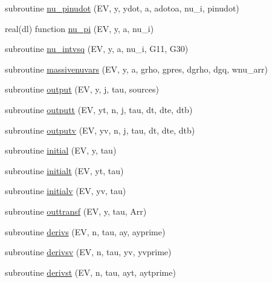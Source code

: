 \begin{DoxyCompactItemize}
\item 
subroutine \mbox{\hyperlink{namespacegaugeinterface_acba44d8f8f824999640418908be29b9b}{nu\+\_\+pinudot}} (EV, y, ydot, a, adotoa, nu\+\_\+i, pinudot)
\item 
real(dl) function \mbox{\hyperlink{namespacegaugeinterface_a33373e2888fd46e2c443d7e8c2785639}{nu\+\_\+pi}} (EV, y, a, nu\+\_\+i)
\item 
subroutine \mbox{\hyperlink{namespacegaugeinterface_a2e8822823d298cb0912b5ec22ea4a6ff}{nu\+\_\+intvsq}} (EV, y, a, nu\+\_\+i, G11, G30)
\item 
subroutine \mbox{\hyperlink{namespacegaugeinterface_ae4228ed9cfb9382025eb84617b0ed091}{massivenuvars}} (EV, y, a, grho, gpres, dgrho, dgq, wnu\+\_\+arr)
\item 
subroutine \mbox{\hyperlink{namespacegaugeinterface_ac370c67bc9750bf5749a69531fe3ffc1}{output}} (EV, y, j, tau, sources)
\item 
subroutine \mbox{\hyperlink{namespacegaugeinterface_a5235d59ec77fa4b3a41d9754c8e447ca}{outputt}} (EV, yt, n, j, tau, dt, dte, dtb)
\item 
subroutine \mbox{\hyperlink{namespacegaugeinterface_ad9126befa5df67da981345f6230fede4}{outputv}} (EV, yv, n, j, tau, dt, dte, dtb)
\item 
subroutine \mbox{\hyperlink{namespacegaugeinterface_aa05aaad2bec1907778ea8eae3a7ba521}{initial}} (EV, y, tau)
\item 
subroutine \mbox{\hyperlink{namespacegaugeinterface_afbc0a211756e4b923725483b6c961e75}{initialt}} (EV, yt, tau)
\item 
subroutine \mbox{\hyperlink{namespacegaugeinterface_aeed464df3ecab21d57bcb789fe3b1a22}{initialv}} (EV, yv, tau)
\item 
subroutine \mbox{\hyperlink{namespacegaugeinterface_ae920635485c908177072c6cad0d49f59}{outtransf}} (EV, y, tau, Arr)
\item 
subroutine \mbox{\hyperlink{namespacegaugeinterface_a1d317261c83f3b5e84fe401ac2436d44}{derivs}} (EV, n, tau, ay, ayprime)
\item 
subroutine \mbox{\hyperlink{namespacegaugeinterface_a25ee0c9e055aabce6b7eb205e65f9804}{derivsv}} (EV, n, tau, yv, yvprime)
\item 
subroutine \mbox{\hyperlink{namespacegaugeinterface_ab2ff4cd74364457862a7ff44fb2ca978}{derivst}} (EV, n, tau, ayt, aytprime)
\end{DoxyCompactItemize}

